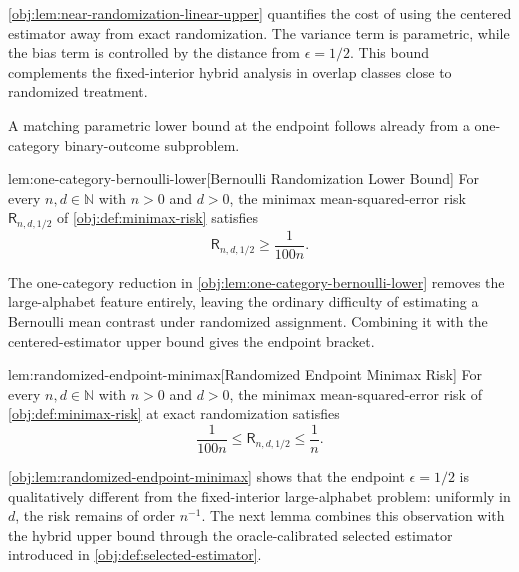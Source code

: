 \cref{obj:lem:near-randomization-linear-upper} quantifies the cost of using the centered estimator away from exact randomization. The variance term is parametric, while the bias term is controlled by the distance from \(\epsilon=1/2\). This bound complements the fixed-interior hybrid analysis in overlap classes close to randomized treatment.

A matching parametric lower bound at the endpoint follows already from a one-category binary-outcome subproblem.

\begin{lemmav}{lem:one-category-bernoulli-lower}[Bernoulli Randomization Lower Bound]
For every \(n,d\in\mathbb N\) with \(n>0\) and \(d>0\), the minimax mean-squared-error risk \(\mathsf R_{n,d,1/2}\) of \cref{obj:def:minimax-risk} satisfies
\[
\mathsf R_{n,d,1/2}\ge \frac{1}{100n}.
\]
\end{lemmav}

The one-category reduction in \cref{obj:lem:one-category-bernoulli-lower} removes the large-alphabet feature entirely, leaving the ordinary difficulty of estimating a Bernoulli mean contrast under randomized assignment. Combining it with the centered-estimator upper bound gives the endpoint bracket.

\begin{lemmav}{lem:randomized-endpoint-minimax}[Randomized Endpoint Minimax Risk]
For every \(n,d\in\mathbb N\) with \(n>0\) and \(d>0\), the minimax mean-squared-error risk of \cref{obj:def:minimax-risk} at exact randomization satisfies
\[
\frac{1}{100n}\le \mathsf R_{n,d,1/2}\le \frac{1}{n}.
\]
\end{lemmav}

\cref{obj:lem:randomized-endpoint-minimax} shows that the endpoint \(\epsilon=1/2\) is qualitatively different from the fixed-interior large-alphabet problem: uniformly in \(d\), the risk remains of order \(n^{-1}\). The next lemma combines this observation with the hybrid upper bound through the oracle-calibrated selected estimator introduced in \cref{obj:def:selected-estimator}.

